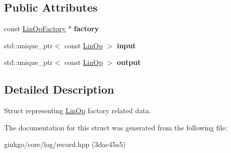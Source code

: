 \subsection*{Public Attributes}
\begin{DoxyCompactItemize}
\item 
\mbox{\label{structgko_1_1log_1_1linop__factory__data_abd892acbefd3c147e384a3dcc897f6ac}} 
const \hyperlink{classgko_1_1LinOpFactory}{Lin\+Op\+Factory} $\ast$ {\bfseries factory}
\item 
\mbox{\label{structgko_1_1log_1_1linop__factory__data_a6ea6595461c7157fa729c91239147f14}} 
std\+::unique\+\_\+ptr$<$ const \hyperlink{classgko_1_1LinOp}{Lin\+Op} $>$ {\bfseries input}
\item 
\mbox{\label{structgko_1_1log_1_1linop__factory__data_a5056dcdd50e3f842c2069959ca85b1c3}} 
std\+::unique\+\_\+ptr$<$ const \hyperlink{classgko_1_1LinOp}{Lin\+Op} $>$ {\bfseries output}
\end{DoxyCompactItemize}


\subsection{Detailed Description}
Struct representing \hyperlink{classgko_1_1LinOp}{Lin\+Op} factory related data. 

The documentation for this struct was generated from the following file\+:\begin{DoxyCompactItemize}
\item 
ginkgo/core/log/record.\+hpp (3dac45a5)\end{DoxyCompactItemize}
